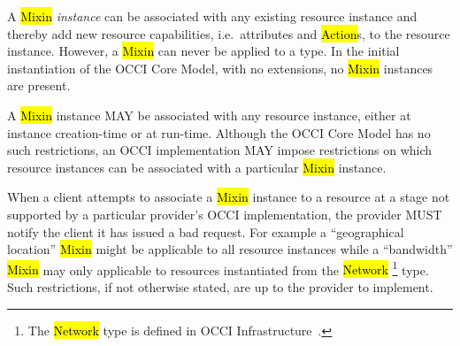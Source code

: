 \documentclass[10pt,a4paper]{article}
\begin{document}
A \hl{Mixin} {\em instance} can be associated with any existing
resource instance and thereby add new resource capabilities,
i.e.~attributes and \hl{Action}s, to the resource instance. However, a
\hl{Mixin} can never be applied to a type.  In the initial
instantiation of the OCCI Core Model, with no extensions, no
\hl{Mixin} instances are present.

A \hl{Mixin} instance MAY be associated with any resource instance,
either at instance creation-time or at run-time. Although the OCCI
Core Model has no such restrictions, an OCCI implementation MAY impose
restrictions on which resource instances can be associated with a
particular \hl{Mixin} instance.

When a client attempts to associate a \hl{Mixin} instance to a
resource at a stage not supported by a particular provider's OCCI
implementation, the provider MUST notify the client it has issued a
bad request.
%
For example a ``geographical location'' \hl{Mixin} might be applicable
to all resource instances while a ``bandwidth'' \hl{Mixin} may only
applicable to resources instantiated from the \hl{Network}%
\footnote{The \hl{Network} type is defined in OCCI
  Infrastructure~\cite{occi:infrastructure}.}  type. Such
restrictions, if not otherwise stated, are up to the provider to
implement.

\end{document}
